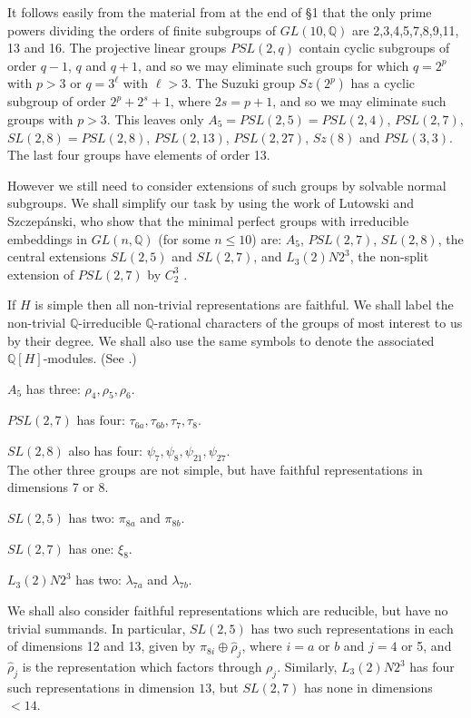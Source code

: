 \documentclass[12pt]{amsart}
\renewcommand{\leq}{\leqslant}
\begin{document}
It follows easily from the material from \cite{KP} at the end of \S1 
that the only prime powers dividing the orders of finite subgroups 
of $GL(10,\mathbb{Q})$ are 2,3,4,5,7,8,9,11, 13 and 16.
The projective linear groups $PSL(2,q)$ contain cyclic subgroups 
of order $q-1$, $q$ and $q+1$, 
and so we may eliminate such groups for which $q=2^p$ with $p>3$
or $q=3^\ell$ with $\ell>3$.
The Suzuki group $Sz(2^p)$ has a cyclic subgroup of order $2^p+2^s+1$,
where $2s=p+1$, and so we may eliminate such groups with $p>3$.
This leaves only $A_5=PSL(2,5)=PSL(2,4)$, $PSL(2,7)$,  $SL(2,8)=PSL(2,8)$,
$PSL(2,13)$,  $PSL(2, 27)$,  $Sz(8)$ and $PSL(3,3)$.
The last four groups have elements of order 13.

However we still need to consider extensions of such groups by 
solvable normal subgroups.
We shall simplify our task by using the work of Lutowski and Szczep\'anski,
who show that the minimal perfect groups with irreducible embeddings in
$GL(n,\mathbb{Q})$ (for some $n\leq10$) are:
$A_5$, $PSL(2,7)$,  $SL(2,8)$,
the central extensions $SL(2,5)$ and $SL(2,7)$,
and $L_3(2)N2^3$, the non-split extension of $PSL(2,7)$ by $C_2^3$ \cite{LuS}.

If $H$ is simple then all non-trivial representations are faithful.
We shall label the non-trivial $\mathbb{Q}$-irreducible $\mathbb{Q}$-rational 
characters of the groups of most interest to us by their degree. 
We shall also use the same symbols to denote the associated $\mathbb{Q}[H]$-modules.
(See \cite{HP}.)

$A_5$ has three: $\rho_4,\rho_5,\rho_6$.

$PSL(2,7)$ has four: $\tau_{6a},\tau_{6b},\tau_7,\tau_8$.

$SL(2,8)$ also has four: $\psi_7,\psi_8,\psi_{21},\psi_{27}$.\\
The other three groups are not simple, 
but have faithful representations in dimensions 7 or 8.

$SL(2,5)$ has two: $\pi_{8a}$ and $\pi_{8b}$.

$SL(2,7)$ has one: $\xi_8$.
 
$L_3(2)N2^3$ has two: $\lambda_{7a}$ and $\lambda_{7b}$.

We shall also consider faithful representations which are reducible, 
but have no trivial summands.
In particular, $SL(2,5)$ has two such representations in each of dimensions 12 and 13,
given by $\pi_{8i}\oplus\widehat\rho_j$, where $i=a$ or $b$ and $j=4$ or 5,
and $\widehat\rho_j$ is the representation which factors through $\rho_j$.
Similarly, $L_3(2)N2^3$ has four such representations in dimension $13$,
but $SL(2,7)$ has none in dimensions $<14$.
\end{document}
